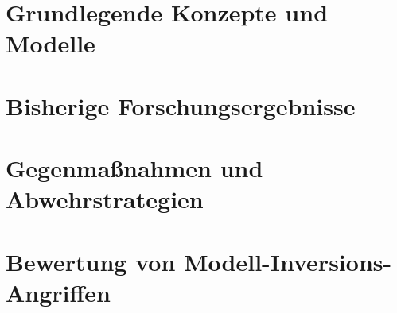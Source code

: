 \section{Grundlegende Konzepte und Modelle}\label{chpt:Stand_der_Technik_MI}
\section{Bisherige Forschungsergebnisse}
\section{Gegenmaßnahmen und Abwehrstrategien}
\section{Bewertung von Modell-Inversions-Angriffen}

